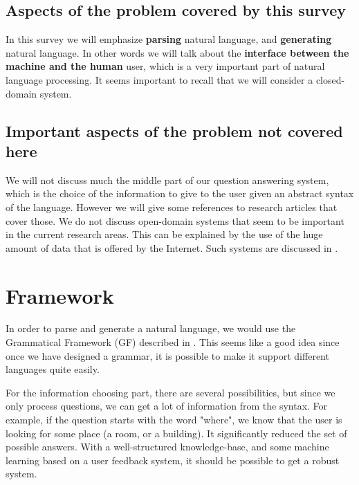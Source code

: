 \documentclass[a4paper,11pt]{article}
\begin{document}
\subsection{Aspects of the problem covered by this survey}
In this survey we will emphasize \textbf{parsing} natural language, and
\textbf{generating} natural language. In other words we will talk about the
\textbf{interface between the machine and the human} user, which is a very
important part of natural language processing. It seems important to recall
that we will consider a closed-domain system.

\subsection{Important aspects of the problem not covered here}
We will not discuss much the middle part of our question answering system, which
is the choice of the information to give to the user given an abstract syntax of
the language. However we will give some references to research articles that
cover those. We do not discuss open-domain systems that seem to be important in
the current research areas. This can be explained by the use of the huge amount
of data that is offered by the Internet. Such systems are discussed in
\cite{designinganopendomainqasystem}.

\section{Framework}
In order to parse and generate a natural language, we would use the Grammatical
Framework (GF) described in \cite{ranta-2011}. This seems like a good idea since
once we have designed a grammar, it is possible to make it support different
languages quite easily.

For the information choosing part, there are several possibilities, but since
we only process questions, we can get a lot of information from the syntax. For
example, if the question starts with the word "where", we know that the user is
looking for some place (a room, or a building). It significantly reduced the set of
possible answers. With a well-structured knowledge-base, and some machine
learning based on a user feedback system, it should be possible to get a robust
system.
\end{document}
